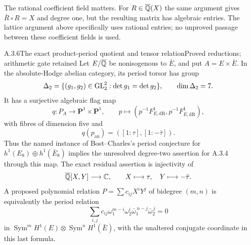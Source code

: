 The rational coefficient field matters. For $R\in\overline{\mathbb Q}(X)$ the same argument gives $\bar R\circ R=X$ and degree one, but the resulting matrix has algebraic entries. The lattice argument above specifically uses rational entries; no unproved passage between these coefficient fields is used.

\begin{result}{A.3.6}{The exact product-period quotient and tensor relation}{Proved reductions; arithmetic gate retained}
Let $E/\overline{\mathbb Q}$ be nonisogenous to $\bar E$, and put $A=E\times\bar E$. In the absolute-Hodge abelian category, its period torsor has group
\[
 \Delta_2=\{(g_1,g_2)\in\operatorname{GL}_2^2:\det g_1=\det g_2\},\qquad \dim\Delta_2=7.
\]
It has a surjective algebraic flag map
\[
 q:P_A\longrightarrow\mathbf P^1\times\mathbf P^1,
 \qquad p\longmapsto(p^{-1}F^1_{E,\mathrm{dR}},p^{-1}F^1_{\bar E,\mathrm{dR}}),
\]
with fibres of dimension five and
\[
 q(p_{\mathrm{an}})=([1:\tau],[1:-\bar\tau]).
\]
Thus the named instance of Bost--Charles's period conjecture for $h^1(E_8)\oplus h^1(\bar E_8)$ implies the unresolved degree-two assertion for A.3.4 through this map. The exact residual assertion is injectivity of
\[
 \overline{\mathbb Q}[X,Y]\longrightarrow\mathbb C,\qquad X\longmapsto\tau,\quad Y\longmapsto-\bar\tau.
\]
A proposed polynomial relation $P=\sum c_{ij}X^iY^j$ of bidegree $(m,n)$ is equivalently the period relation
\[
 \sum_{i,j}c_{ij}\omega_1^{m-i}\omega_2^i
 \bar\omega_1^{\,n-j}\bar\omega_2^{\,j}=0
 \tag{A.3.6}
\]
in $\operatorname{Sym}^m H^1(E)\otimes\operatorname{Sym}^n H^1(\bar E)$, with the unaltered conjugate coordinate in this last formula.
\end{result}
